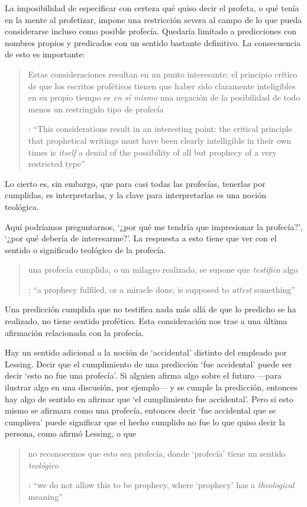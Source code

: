 La imposibilidad de especificar con certeza qué quiso decir el profeta, o qué tenía en la mente al profetizar, impone una restricción severa al campo de lo que pueda considerarse incluso como posible profecía. Quedaría limitado a predicciones con nombres propios y predicados con un sentido bastante definitivo. La consecuencia de esto es importante: \blockquote[{\cite[31]{anscombe2008faith:prophandmi}}: \enquote{This considerations result in an interesting point: the critical principle that prophetical writings must have been clearly intelligible in their own times is \emph{itself} a denial of the possibility of all but prophecy of a very restricted type}]{Estas consideraciones resultan en un punto interesante: el principio crítico de que los escritos proféticos tienen que haber sido claramente inteligibles en su propio tiempo es \emph{en sí mismo} una negación de la posibilidad de todo menos un restringido tipo de profecía}. Lo cierto es, sin embargo, que para casi todas las profecías, tenerlas por cumplidas, es interpretarlas, y la clave para interpretarlas es una noción teológica.

Aquí podríamos preguntarnos, \enquote*{¿por qué me tendría que impresionar la profecía?}, \enquote*{¿por qué debería de interesarme?}. La respuesta a esto tiene que ver con el sentido o significado teológico de la profecía. \blockquote[{\cite[32]{anscombe2008faith:prophandmi}}: \enquote{a prophecy fulfiled, or a miracle done, is supposed to \emph{attest} something}]{una profecía cumplida, o un milagro realizado, se supone que \emph{testifica} algo}. Una predicción cumplida que no testifica nada más allá de que lo predicho se ha realizado, no tiene sentido profético. Esta consideración nos trae a una última afirmación relacionada con la profecía.

Hay un sentido adicional a la noción de `accidental' distinto del empleado por Lessing. Decir que el cumplimiento de una predicción \enquote*{fue accidental} puede ser decir \enquote*{esto no fue una profecía}. Si alguien afirma algo sobre el futuro ---para ilustrar algo en una discusión, por ejemplo--- y se cumple la predicción, entonces hay algo de sentido en afirmar que \enquote*{el cumplimiento fue accidental}. Pero si esto mismo se afirmara como una profecía, entonces decir \enquote*{fue accidental que se cumpliera} puede significar que el hecho cumplido no fue lo que quiso decir la persona, como afirmó Lessing, o que \blockquote[{\cite[34]{anscombe2008faith:prophandmi}}: \enquote{we do not allow this to be prophecy, where `prophecy' has a \emph{theological} meaning}]{no reconocemos que esto sea profecía, donde `profecía' tiene un sentido \emph{teológico}}.

